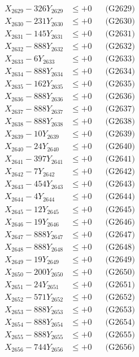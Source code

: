 \documentclass[a4paper,10pt]{article}
\begin{document}
{\begin{align}
X_{2629} - 326Y_{2629} &\leq +0 && \text{(G2629)} \\
X_{2630} - 231Y_{2630} &\leq +0 && \text{(G2630)} \\
\allowbreak
X_{2631} - 145Y_{2631} &\leq +0 && \text{(G2631)} \\
X_{2632} - 888Y_{2632} &\leq +0 && \text{(G2632)} \\
X_{2633} - 6Y_{2633} &\leq +0 && \text{(G2633)} \\
X_{2634} - 888Y_{2634} &\leq +0 && \text{(G2634)} \\
X_{2635} - 162Y_{2635} &\leq +0 && \text{(G2635)} \\
X_{2636} - 888Y_{2636} &\leq +0 && \text{(G2636)} \\
X_{2637} - 888Y_{2637} &\leq +0 && \text{(G2637)} \\
X_{2638} - 888Y_{2638} &\leq +0 && \text{(G2638)} \\
X_{2639} - 10Y_{2639} &\leq +0 && \text{(G2639)} \\
X_{2640} - 24Y_{2640} &\leq +0 && \text{(G2640)} \\
\allowbreak
X_{2641} - 397Y_{2641} &\leq +0 && \text{(G2641)} \\
X_{2642} - 7Y_{2642} &\leq +0 && \text{(G2642)} \\
X_{2643} - 454Y_{2643} &\leq +0 && \text{(G2643)} \\
X_{2644} - 4Y_{2644} &\leq +0 && \text{(G2644)} \\
X_{2645} - 12Y_{2645} &\leq +0 && \text{(G2645)} \\
X_{2646} - 19Y_{2646} &\leq +0 && \text{(G2646)} \\
X_{2647} - 888Y_{2647} &\leq +0 && \text{(G2647)} \\
X_{2648} - 888Y_{2648} &\leq +0 && \text{(G2648)} \\
X_{2649} - 19Y_{2649} &\leq +0 && \text{(G2649)} \\
X_{2650} - 200Y_{2650} &\leq +0 && \text{(G2650)} \\
\allowbreak
X_{2651} - 24Y_{2651} &\leq +0 && \text{(G2651)} \\
X_{2652} - 571Y_{2652} &\leq +0 && \text{(G2652)} \\
X_{2653} - 888Y_{2653} &\leq +0 && \text{(G2653)} \\
X_{2654} - 888Y_{2654} &\leq +0 && \text{(G2654)} \\
X_{2655} - 888Y_{2655} &\leq +0 && \text{(G2655)} \\
X_{2656} - 744Y_{2656} &\leq +0 && \text{(G2656)} \\

\end{align}}
\end{document}
